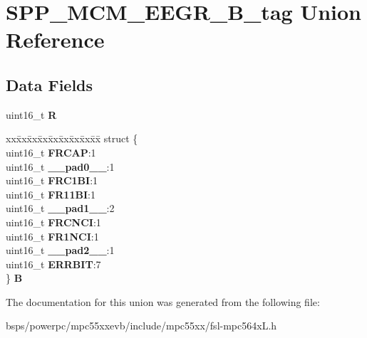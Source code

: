 \hypertarget{unionSPP__MCM__EEGR__16B__tag}{}\section{S\+P\+P\+\_\+\+M\+C\+M\+\_\+\+E\+E\+G\+R\+\_\+B\+\_\+tag Union Reference}
\label{unionSPP__MCM__EEGR__16B__tag}
\subsection*{Data Fields}
\begin{DoxyCompactItemize}
\item 
\mbox{\label{unionSPP__MCM__EEGR__16B__tag_af9dd5b754413d6d8b22a4b9a6bb31f75}} 
uint16\+\_\+t {\bfseries R}
\item 
\mbox{\label{unionSPP__MCM__EEGR__16B__tag_a8ed33ad5dfe7c049d5906f2397ff1cf8}} 
\begin{tabbing}
xx\=xx\=xx\=xx\=xx\=xx\=xx\=xx\=xx\=\kill
struct \{\\
\>uint16\_t {\bfseries FRCAP}:1\\
\>uint16\_t {\bfseries \_\_pad0\_\_}:1\\
\>uint16\_t {\bfseries FRC1BI}:1\\
\>uint16\_t {\bfseries FR11BI}:1\\
\>uint16\_t {\bfseries \_\_pad1\_\_}:2\\
\>uint16\_t {\bfseries FRCNCI}:1\\
\>uint16\_t {\bfseries FR1NCI}:1\\
\>uint16\_t {\bfseries \_\_pad2\_\_}:1\\
\>uint16\_t {\bfseries ERRBIT}:7\\
\} {\bfseries B}\\

\end{tabbing}\end{DoxyCompactItemize}


The documentation for this union was generated from the following file\+:\begin{DoxyCompactItemize}
\item 
bsps/powerpc/mpc55xxevb/include/mpc55xx/fsl-\/mpc564x\+L.\+h\end{DoxyCompactItemize}
